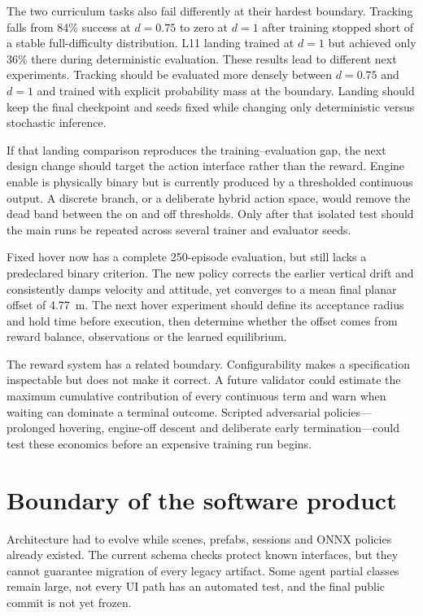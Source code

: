 The two curriculum tasks also fail differently at their hardest boundary. Tracking falls from
84\% success at $d=0.75$ to zero at $d=1$ after training stopped short of a stable full-difficulty
distribution. L11 landing trained at $d=1$ but achieved only 36\% there during deterministic
evaluation. These results lead to different next experiments. Tracking should be evaluated more
densely between $d=0.75$ and $d=1$ and trained with explicit probability mass at the boundary.
Landing should keep the final checkpoint and seeds fixed while changing only deterministic
versus stochastic inference.

If that landing comparison reproduces the training--evaluation gap, the next design change
should target the action interface rather than the reward. Engine enable is physically binary
but is currently produced by a thresholded continuous output. A discrete branch, or a deliberate
hybrid action space, would remove the dead band between the on and off thresholds. Only after
that isolated test should the main runs be repeated across several trainer and evaluator seeds.

Fixed hover now has a complete 250-episode evaluation, but still lacks a predeclared binary
criterion. The new policy corrects the earlier vertical drift and consistently damps velocity
and attitude, yet converges to a mean final planar offset of \SI{4.77}{m}. The next hover
experiment should define its acceptance radius and hold time before execution, then determine
whether the offset comes from reward balance, observations or the learned equilibrium.

The reward system has a related boundary. Configurability makes a specification inspectable but
does not make it correct. A future validator could estimate the maximum cumulative contribution
of every continuous term and warn when waiting can dominate a terminal outcome. Scripted
adversarial policies---prolonged hovering, engine-off descent and deliberate early
termination---could test these economics before an expensive training run begins.

\section{Boundary of the software product}

Architecture had to evolve while scenes, prefabs, sessions and ONNX policies already existed.
The current schema checks protect known interfaces, but they cannot guarantee migration of every
legacy artifact. Some agent partial classes remain large, not every UI path has an automated
test, and the final public commit is not yet frozen.

